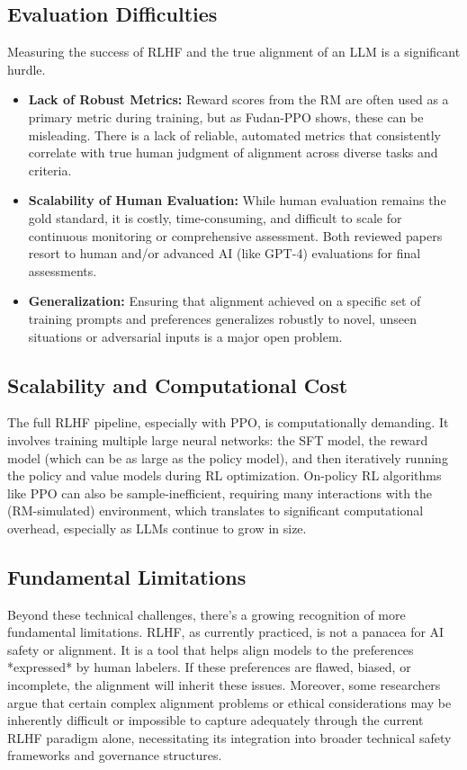 \documentclass[10pt,journal,compsoc]{IEEEtran} %
\begin{document}
\subsection{Evaluation Difficulties}
Measuring the success of RLHF and the true alignment of an LLM is a significant hurdle.
\begin{itemize}
    \item \textbf{Lack of Robust Metrics:} Reward scores from the RM are often used as a primary metric during training, but as Fudan-PPO shows, these can be misleading. \cite{Zheng2023PPO} There is a lack of reliable, automated metrics that consistently correlate with true human judgment of alignment across diverse tasks and criteria. \cite{Zheng2023PPO}
    \item \textbf{Scalability of Human Evaluation:} While human evaluation remains the gold standard, it is costly, time-consuming, and difficult to scale for continuous monitoring or comprehensive assessment. \cite{Zheng2023PPO} Both reviewed papers resort to human and/or advanced AI (like GPT-4) evaluations for final assessments. \cite{Zheng2023PPO, Dai2023SafeRLHF}
    \item \textbf{Generalization:} Ensuring that alignment achieved on a specific set of training prompts and preferences generalizes robustly to novel, unseen situations or adversarial inputs is a major open problem.
\end{itemize}

\subsection{Scalability and Computational Cost}
The full RLHF pipeline, especially with PPO, is computationally demanding. It involves training multiple large neural networks: the SFT model, the reward model (which can be as large as the policy model), and then iteratively running the policy and value models during RL optimization. \cite{Zheng2023PPO} On-policy RL algorithms like PPO can also be sample-inefficient, requiring many interactions with the (RM-simulated) environment, which translates to significant computational overhead, especially as LLMs continue to grow in size. \cite{Tang2024AsyncRLHF}

\subsection{Fundamental Limitations}
Beyond these technical challenges, there's a growing recognition of more fundamental limitations. RLHF, as currently practiced, is not a panacea for AI safety or alignment. \cite{Casper2023OpenProblems, MontrealEthicsRLHFBlog} It is a tool that helps align models to the preferences *expressed* by human labelers. If these preferences are flawed, biased, or incomplete, the alignment will inherit these issues. Moreover, some researchers argue that certain complex alignment problems or ethical considerations may be inherently difficult or impossible to capture adequately through the current RLHF paradigm alone, necessitating its integration into broader technical safety frameworks and governance structures. \cite{Casper2023OpenProblems, MontrealEthicsRLHFBlog}
\end{document}
